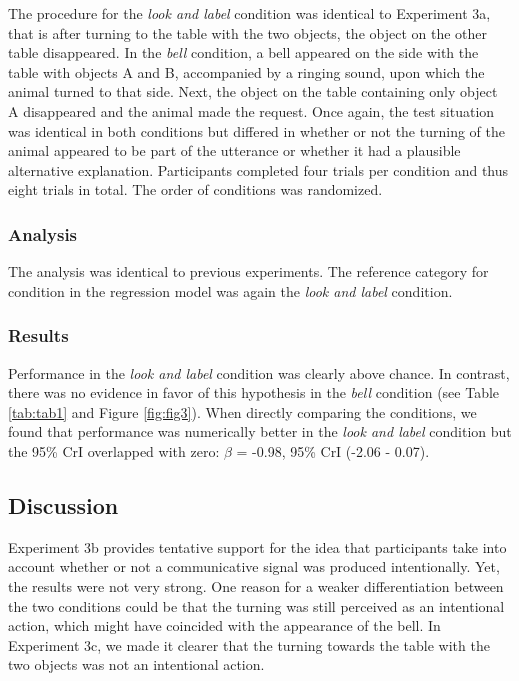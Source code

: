 \documentclass[
  man,floatsintext]{apa6}
\begin{document}
The procedure for the \emph{look and label} condition was identical to Experiment 3a, that is after turning to the table with the two objects, the object on the other table disappeared. In the \emph{bell} condition, a bell appeared on the side with the table with objects A and B, accompanied by a ringing sound, upon which the animal turned to that side. Next, the object on the table containing only object A disappeared and the animal made the request. Once again, the test situation was identical in both conditions but differed in whether or not the turning of the animal appeared to be part of the utterance or whether it had a plausible alternative explanation. Participants completed four trials per condition and thus eight trials in total. The order of conditions was randomized.

\hypertarget{analysis-4}{%
\subsubsection{Analysis}\label{analysis-4}}

The analysis was identical to previous experiments. The reference category for condition in the regression model was again the \emph{look and label} condition.

\hypertarget{results-4}{%
\subsubsection{Results}\label{results-4}}

Performance in the \emph{look and label} condition was clearly above chance. In contrast, there was no evidence in favor of this hypothesis in the \emph{bell} condition (see Table \ref{tab:tab1} and Figure \ref{fig:fig3}). When directly comparing the conditions, we found that performance was numerically better in the \emph{look and label} condition but the 95\% CrI overlapped with zero: \(\beta\) = -0.98, 95\% CrI (-2.06 - 0.07).

\hypertarget{discussion-4}{%
\subsection{Discussion}\label{discussion-4}}

Experiment 3b provides tentative support for the idea that participants take into account whether or not a communicative signal was produced intentionally. Yet, the results were not very strong. One reason for a weaker differentiation between the two conditions could be that the turning was still perceived as an intentional action, which might have coincided with the appearance of the bell. In Experiment 3c, we made it clearer that the turning towards the table with the two objects was not an intentional action.
\end{document}

